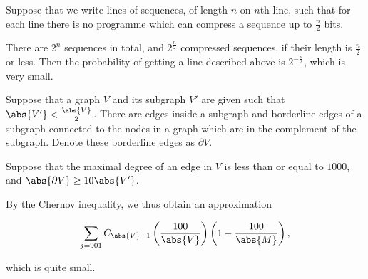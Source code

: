 \documentclass[11pt]{scrartcl}
\begin{document}
\begin{example}

  Suppose that we write lines of sequences, of length $n$ on $n$th
  line, such that for each line there is no programme which can
  compress a sequence up to $\frac{n}{2}$ bits.

  There are $2^{n}$ sequences in total, and $2^{\frac{n}{2}}$
  compressed sequences, if their length is $\frac{n}{2}$ or less. Then
  the probability of getting a line described above is
  $2^{-\frac{n}{2}}$, which is very small.

  
\end{example}
\begin{example}[Expanders]

Suppose that a graph $V$ and its subgraph $V'$ are given such that
$\abs{V'} < \frac{\abs{V}}{2}$. There are edges inside a subgraph and
borderline edges of a subgraph connected to the nodes in a graph which
are in the complement of the subgraph. Denote these borderline edges
as $\partial V$.

Suppose that the maximal degree of an edge in $V$ is less than or
equal to $1000$, and $\abs{\partial V} \geq 10 \abs{V'}$.

By the Chernov inequality, we thus obtain an approximation

\begin{equation*}
  \sum_{j= 901}C_{\abs{V}-1}\left(\frac{100}{\abs{V}}\right)\left(1-\frac{100}{\abs{M}}\right),
\end{equation*}

which is quite small. 

\end{example}
\end{document}
